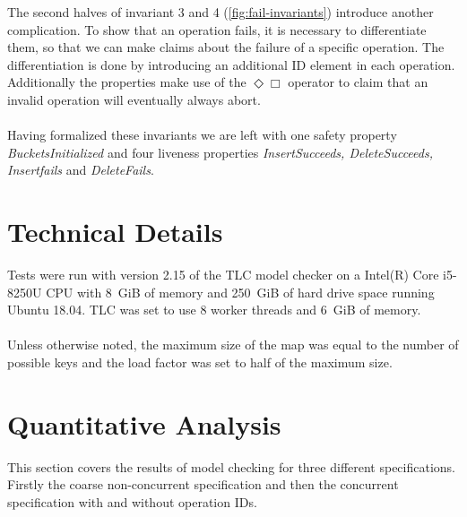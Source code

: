 \documentclass{uit-thesis}
\begin{document}
The second halves of invariant 3 and 4 (\autoref{fig:fail-invariants}) introduce another complication. To show that an operation fails, it is necessary to differentiate them, so that we can make claims about the failure of a specific operation. The differentiation is done by introducing an additional ID element in each operation. Additionally the properties make use of the $\Diamond \Box$ operator to claim that an invalid operation will eventually always abort.
\\\\
Having formalized these invariants we are left with one safety property \textit{BucketsInitialized} and four liveness properties \textit{InsertSucceeds, DeleteSucceeds, Insertfails} and \textit{DeleteFails}.

\section{Technical Details}\label{sec:tech-details}
Tests were run with version 2.15 of the TLC model checker on a Intel(R) Core i5-8250U CPU with 8~GiB of memory and 250~GiB of hard drive space running Ubuntu 18.04. TLC was set to use 8 worker threads and 6~GiB of memory.
\\\\
Unless otherwise noted, the maximum size of the map was equal to the number of possible keys and the load factor was set to half of the maximum size.

\section{Quantitative Analysis}
This section covers the results of model checking for three different specifications. Firstly the coarse non-concurrent specification and then the concurrent specification with and without operation IDs.
\end{document}
